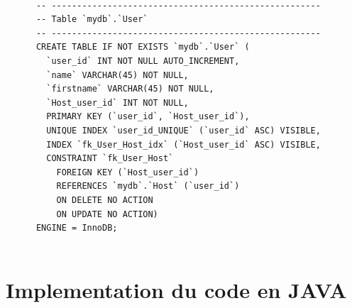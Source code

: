 \documentclass{report}
\begin{document}
\begin{lstlisting}
      
      -- -----------------------------------------------------
      -- Table `mydb`.`User`
      -- -----------------------------------------------------
      CREATE TABLE IF NOT EXISTS `mydb`.`User` (
        `user_id` INT NOT NULL AUTO_INCREMENT,
        `name` VARCHAR(45) NOT NULL,
        `firstname` VARCHAR(45) NOT NULL,
        `Host_user_id` INT NOT NULL,
        PRIMARY KEY (`user_id`, `Host_user_id`),
        UNIQUE INDEX `user_id_UNIQUE` (`user_id` ASC) VISIBLE,
        INDEX `fk_User_Host_idx` (`Host_user_id` ASC) VISIBLE,
        CONSTRAINT `fk_User_Host`
          FOREIGN KEY (`Host_user_id`)
          REFERENCES `mydb`.`Host` (`user_id`)
          ON DELETE NO ACTION
          ON UPDATE NO ACTION)
      ENGINE = InnoDB;
      
    \end{lstlisting}
\chapter{Implementation du code en JAVA}
\end{document}
